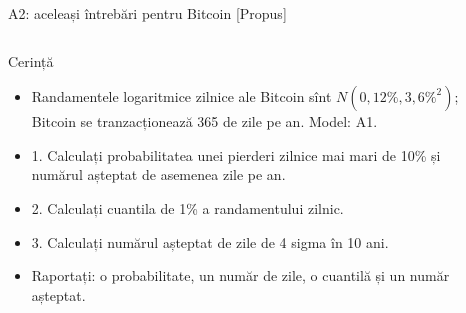 \begin{frame}{A2: aceleași întrebări pentru Bitcoin [Propus]}
\propsub
\itemsize{\footnotesize}
\begin{columns}[T]
\begin{column}{\taskw}
\begin{block}{Cerință}
\begin{itemize}
    \item Randamentele logaritmice zilnice ale Bitcoin sînt $N(0{,}12\%, 3{,}6\%^2)$; Bitcoin se tranzacționează 365 de zile pe an. Model: A1.
    \item 1. Calculați probabilitatea unei pierderi zilnice mai mari de 10\% și numărul așteptat de asemenea zile pe an.
    \item 2. Calculați cuantila de 1\% a randamentului zilnic.
    \item 3. Calculați numărul așteptat de zile de 4 sigma în 10 ani.
    \item Raportați: o probabilitate, un număr de zile, o cuantilă și un număr așteptat.
\end{itemize}
\end{block}
\end{column}
\begin{column}{\solw}
\end{column}
\end{columns}
\end{frame}

